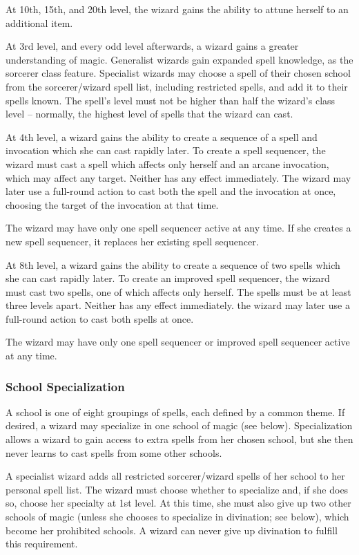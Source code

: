 \par At 10th, 15th, and 20th level, the wizard gains the ability to attune herself to an additional item.

 At 3rd level, and every odd level afterwards, a wizard gains a greater understanding of magic. Generalist wizards gain expanded spell knowledge, as the sorcerer class feature. Specialist wizards may choose a spell of their chosen school from the sorcerer/wizard spell list, including restricted spells, and add it to their spells known. The spell's level must not be higher than half the wizard's class level -- normally, the highest level of spells that the wizard can cast.

 At 4th level, a wizard gains the ability to create a sequence of a spell and invocation which she can cast rapidly later. To create a spell sequencer, the wizard must cast a spell which affects only herself and an arcane invocation, which may affect any target. Neither has any effect immediately. The wizard may later use a full-round action to cast both the spell and the invocation at once, choosing the target of the invocation at that time.
\par The wizard may have only one spell sequencer active at any time. If she creates a new spell sequencer, it replaces her existing spell sequencer.

 At 8th level, a wizard gains the ability to create a sequence of two spells which she can cast rapidly later. To create an improved spell sequencer, the wizard must cast two spells, one of which affects only herself. The spells must be at least three levels apart. Neither has any effect immediately. the wizard may later use a full-round action to cast both spells at once.
\par The wizard may have only one spell sequencer or improved spell sequencer active at any time.

 \subsubsection{School Specialization}
A school is one of eight groupings of spells, each defined by a common theme. If desired, a wizard may specialize in one school of magic (see below). Specialization allows a wizard to gain access to extra spells from her chosen school, but she then never learns to cast spells from some other schools.

\par A specialist wizard adds all restricted sorcerer/wizard spells of her school to her personal spell list.  The wizard must choose whether to specialize and, if she does so, choose her specialty at 1st level. At this time, she must also give up two other schools of magic (unless she chooses to specialize in divination; see below), which become her prohibited schools. A wizard can never give up divination to fulfill this requirement.

